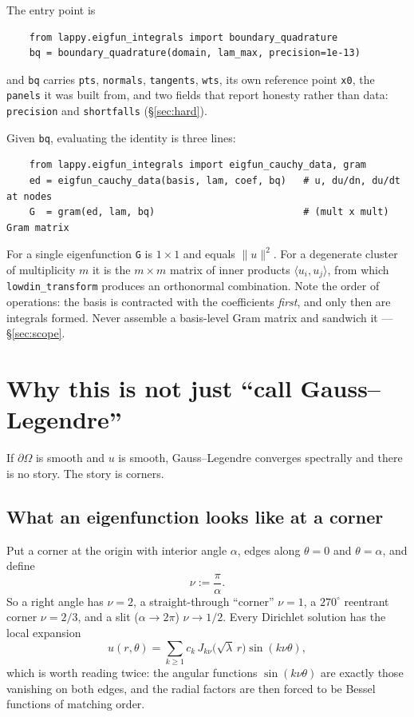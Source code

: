 \documentclass[11pt]{article}
\theoremstyle{definition}
\theoremstyle{remark}
\newcommand{\Om}{\Omega}
\newcommand{\code}[1]{\texttt{#1}}
\begin{document}
\noindent
The entry point is
\begin{verbatim}
    from lappy.eigfun_integrals import boundary_quadrature
    bq = boundary_quadrature(domain, lam_max, precision=1e-13)
\end{verbatim}
and \code{bq} carries \code{pts}, \code{normals}, \code{tangents}, \code{wts},
its own reference point \code{x0}, the \code{panels} it was built from, and two
fields that report honesty rather than data: \code{precision} and
\code{shortfalls} (\S\ref{sec:hard}).

Given \code{bq}, evaluating the identity is three lines:
\begin{verbatim}
    from lappy.eigfun_integrals import eigfun_cauchy_data, gram
    ed = eigfun_cauchy_data(basis, lam, coef, bq)   # u, du/dn, du/dt at nodes
    G  = gram(ed, lam, bq)                          # (mult x mult) Gram matrix
\end{verbatim}
For a single eigenfunction \code{G} is $1\times1$ and equals $\|u\|^2$. For a
degenerate cluster of multiplicity $m$ it is the $m\times m$ matrix of inner
products $\langle u_i,u_j\rangle$, from which \code{lowdin\_transform} produces
an orthonormal combination. Note the order of operations: the basis is contracted
with the coefficients \emph{first}, and only then are integrals formed. Never
assemble a basis-level Gram matrix and sandwich it --- \S\ref{sec:scope}.

\section{Why this is not just ``call Gauss--Legendre''}

If $\partial\Om$ is smooth and $u$ is smooth, Gauss--Legendre converges
spectrally and there is no story. The story is corners.

\subsection{What an eigenfunction looks like at a corner}

Put a corner at the origin with interior angle $\alpha$, edges along $\theta=0$
and $\theta=\alpha$, and define
\begin{equation}
  \nu := \frac{\pi}{\alpha}.
\end{equation}
So a right angle has $\nu=2$, a straight-through ``corner'' $\nu=1$, a
$270^\circ$ reentrant corner $\nu=2/3$, and a slit ($\alpha\to2\pi$) $\nu\to1/2$.
Every Dirichlet solution has the local expansion
\begin{equation}\label{eq:expansion}
  u(r,\theta)=\sum_{k\ge1}c_k\,J_{k\nu}\!\big(\sqrt\lambda\,r\big)\sin(k\nu\theta),
\end{equation}
which is worth reading twice: the angular functions $\sin(k\nu\theta)$ are
exactly those vanishing on both edges, and the radial factors are then forced to
be Bessel functions of matching order.
\end{document}
